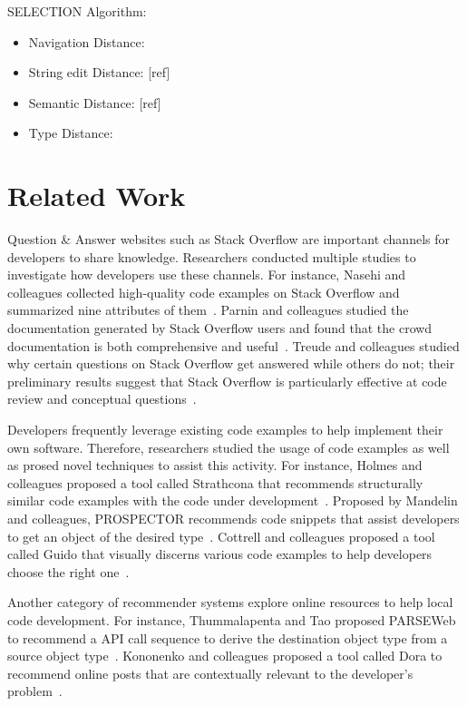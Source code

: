 SELECTION Algorithm:
\begin{itemize}
\item Navigation Distance: 
\item String edit Distance: [ref]
\item Semantic Distance: [ref]
\item Type Distance:
\end{itemize}

\section{Related Work}
Question \& Answer websites such as Stack Overflow are important channels for
developers to share knowledge. Researchers conducted multiple studies to
investigate how developers use these channels. For instance, Nasehi and
colleagues collected high-quality code examples on Stack Overflow and summarized
nine attributes of them~\cite{Nasehi}. Parnin and colleagues studied the
documentation generated by Stack Overflow users and found that the crowd
documentation is both comprehensive and useful~\cite{Parnin}. Treude and
colleagues studied why certain questions on Stack Overflow get answered while
others do not; their preliminary results suggest that Stack Overflow is
particularly effective at code review and conceptual questions~\cite{Treude}.


Developers frequently leverage existing code examples to help implement their
own software. Therefore, researchers studied the usage of code examples as well
as prosed novel techniques to assist this activity. For instance, Holmes and
colleagues proposed a tool called Strathcona that recommends structurally
similar code examples with the code under development~\cite{Holmes2}.
Proposed by Mandelin and colleagues, PROSPECTOR recommends code snippets that
assist developers to get an object of the desired type~\cite{Mandelin}. Cottrell
and colleagues proposed a tool called Guido that visually discerns various code
examples to help developers choose the right one~\cite{Cottrell}.

Another category of recommender systems explore online resources to help local
code development. For instance, Thummalapenta and Tao proposed PARSEWeb to
recommend a API call sequence to derive the destination object type from a
source object type~\cite{Thummalapenta}. Kononenko and colleagues proposed a
tool called Dora to recommend online posts that are contextually relevant to the
developer's problem~\cite{Kononenko}.

